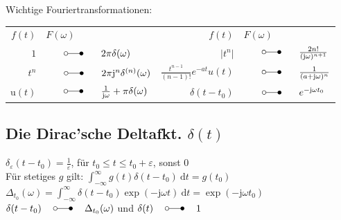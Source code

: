 \documentclass[6pt,a4paper]{scrartcl}
\let\oldlaplace = \laplace
\renewcommand{\i}{\ensuremath{\mathrm{j}}}										%
\newcommand{\diff}{\ensuremath{\ \mathrm d}}									%
\newcommand{\heavi}{\ensuremath{\mathrm{u}}}									%
\renewcommand{\laplace}{\ \; \oldlaplace \ \;}
\newcommand{\R}{\ensuremath{\mathbb R}}
\begin{document}
\begin{multicols}{4}
	
	Wichtige Fouriertransformationen:\\
	\begin{tabular}{rl|rl}
		$f(t)$ & \qquad $F(\omega)$ & $f(t)$ & \qquad $F(\omega)$\\		%
		$1$ & \!\!\!\!\!\!\!\!\!\! $\laplace 2\pi \delta(\omega)$ & $|t^n|$ & \!\!\!\!\!\!\!\!\!\! $\laplace \frac{2n!}{(\i \omega)^{n+1}}$\\
		$t^n$ & \!\!\!\!\!\!\!\!\!\! $\laplace 2\pi \i^n \delta^{(n)}(\omega)$ & $\frac{t^{n-1}}{(n-1)!} e^{-at} u(t)$ & \!\!\!\!\!\!\!\!\!\! $\laplace \frac{1}{(a+\i \omega)^n}$\\[0.5em]
		$\heavi(t)$ & \!\!\!\!\!\!\!\!\!\! $\laplace \frac{1}{\i \omega} + \pi \delta(\omega)$ & $\delta(t-t_0)$ & \!\!\!\!\!\!\!\!\!\! $\laplace e^{-\i \omega t_0}$
	\end{tabular}
	
	
	
	\subsection{Die Dirac'sche Deltafkt. $\delta(t)$}
	$\delta_\varepsilon(t-t_0) = \frac{1}{\varepsilon}$, für $t_0 \le t \le t_0 + \varepsilon$, sonst $0$\\
	Für stetiges $g$ gilt: $\int_{-\infty}^\infty g(t) \delta(t-t_0) \diff t = g(t_0)$\\
	$\Delta_{t_0} (\omega) = \int_{-\infty}^\infty \delta(t-t_0) \exp(-\i \omega t) \diff t = \exp(-\i \omega t_0)$\\
	$\delta(t-t_0) \laplace \Delta_{t_0} (\omega)$ und $\delta(t) \laplace 1$
	

\end{multicols}
\end{document}
